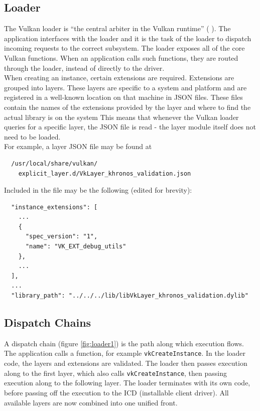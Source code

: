 \documentclass[12pt]{report}
\newcommand{\citebu}[1]{(\citenoparen{#1})}
\newcommand{\citenoparen}[1]{\citeauthor{#1} \citeyear{#1}}
\theoremstyle{definition}
\begin{document}
      \subsection{Loader}

      The Vulkan loader is ``the central arbiter in the Vulkan runtime'' \citebu{renderdoc}.
      The application interfaces with the loader and it is the task of the
      loader to dispatch incoming requests to the correct subsystem. The
      loader exposes all of the core Vulkan functions. When an application
      calls such functions, they are routed through the loader, instead of
      directly to the driver. \\

      When creating an instance, certain extensions are required. Extensions
      are grouped into layers. These layers are specific to a system and
      platform and are registered in a well-known location on that machine
      in JSON files. These files contain the names of the extensions provided
      by the layer and where to find the actual library is on the system This
      means that whenever the Vulkan loader queries for a specific layer, the
      JSON file is read - the layer module itself does not need to be loaded. \\

      For example, a layer JSON file may be found at \\

      \begin{lstlisting}
  /usr/local/share/vulkan/
    explicit_layer.d/VkLayer_khronos_validation.json
      \end{lstlisting}
      \vspace{5mm}

      Included in the file may be the following (edited for brevity):

      \begin{lstlisting}
  "instance_extensions": [
    ...
    {   
      "spec_version": "1", 
      "name": "VK_EXT_debug_utils"
    },
    ...
  ],
  ...
  "library_path": "../../../lib/libVkLayer_khronos_validation.dylib"
      \end{lstlisting}
      \vspace{5mm}

      \subsection{Dispatch Chains}

      A dispatch chain (figure \ref{fig:loader1}) is the path along which execution flows. The application
      calls a function, for example \texttt{vkCreateInstance}. In the loader code, the
      layers and extensions are validated. The loader then passes execution
      along to the first layer, which also calls \texttt{vkCreateInstance}, then
      passing execution along to the following layer. The loader terminates
      with its own code, before passing off the execution to the ICD
      (installable client driver). All available layers are now combined
      into one unified front.
\end{document}
